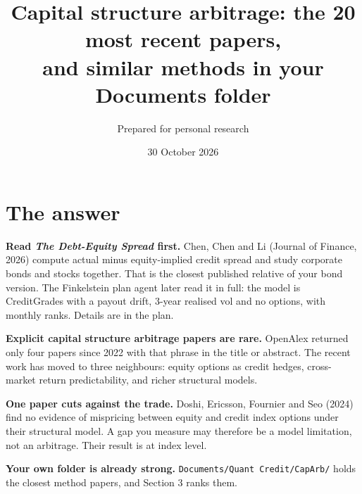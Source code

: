 \documentclass[10pt,a4paper]{article}
\title{Capital structure arbitrage: the 20 most recent papers,\\and similar methods in your Documents folder}
\author{Prepared for personal research}
\date{30 October 2026}
\begin{document}
\maketitle

\section*{The answer}
\textbf{Read \emph{The Debt-Equity Spread} first.} Chen, Chen and Li (Journal of Finance, 2026) compute actual minus equity-implied credit spread and study corporate bonds and stocks together. That is the closest published relative of your bond version. The Finkelstein plan agent later read it in full: the model is CreditGrades with a payout drift, 3-year realised vol and no options, with monthly ranks. Details are in the plan.

\textbf{Explicit capital structure arbitrage papers are rare.} OpenAlex returned only four papers since 2022 with that phrase in the title or abstract. The recent work has moved to three neighbours: equity options as credit hedges, cross-market return predictability, and richer structural models.

\textbf{One paper cuts against the trade.} Doshi, Ericsson, Fournier and Seo (2024) find no evidence of mispricing between equity and credit index options under their structural model. A gap you measure may therefore be a model limitation, not an arbitrage. Their result is at index level.

\textbf{Your own folder is already strong.} \texttt{Documents/Quant Credit/CapArb/} holds the closest method papers, and Section 3 ranks them.
\end{document}
